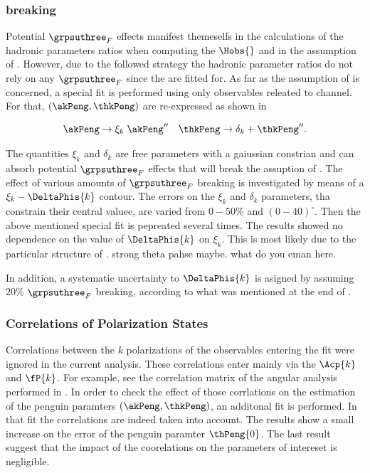 \subsubsection{\grpsuthree breaking}
\label{su3_breaking}
Potential $\grpsuthree_F$ effects manifest themeselfs in the calculations of the hadronic parameters ratios
when computing the $\Hobs{}$ and in the assumption of . However, due to the followed strategy
the hadronic parameter ratios do not rely on any $\grpsuthree_F$ since the are fitted for.
As far as the assumption of  is concerned, a special fit is performed using only observables
releated to \BdJpsiRho channel. For that, $(\akPeng,\thkPeng)$ are re-expressed as shown in 

\begin{equation}
  \akPeng \to \xi_k \; \akPeng'' \quad \thkPeng \to \delta_k + \thkPeng''.
\label{su3_breaking}
\end{equation}

\noindent The quantities $\xi_k$ and $\delta_k$ are free parameters with a gaiussian constrian and can absorb
potential $\grpsuthree_F$ effects that will break the assuption of . The effect of various
amounts of $\grpsuthree_F$ breaking is investigated by means of a $\xi_k-\DeltaPhis{k}$ contour. The errors on the
$\xi_k$ and $\delta_k$ parameters, tha constrain their central valuee, are varied from $0-50\%$ and $(0-40)^{\circ}$.
Then the above mentioned special fit is pepreated several times. The results showed no dependence on the value
of $\DeltaPhis{k}$ on $\xi_k$. This is most likely due to the particular structure of . {\color{red}strong theta pahse maybe. what do you eman here.}

In addition, a systematic uncertainty to $\DeltaPhis{k}$ is asigned by assuming $20\%$ $\grpsuthree_F$ breaking,
according to what was mentioned at the end of .

\subsubsection{Correlations of Polarization States}
Correlations between the $k$ polarizations of the observables entering the \chisq fit were ignored in the
current analysis. These correlations enter mainly via the $\Acp{k}$ and $\fP{k}$. For example, see the
correlation matrix  of the angular analysis performed in .
In order to check the effect of those corrlations on the estimation of the penguin paramters $(\akPeng,\thkPeng)$,
an additonal \chisq fit is performed. In that fit the correlations are indeed taken into account.
The results show a small increase on the error of the penguin paramter $\thPeng{0}$.
The last result suggest that the impact of the coorelations on the parameters of intereset is negligible.
